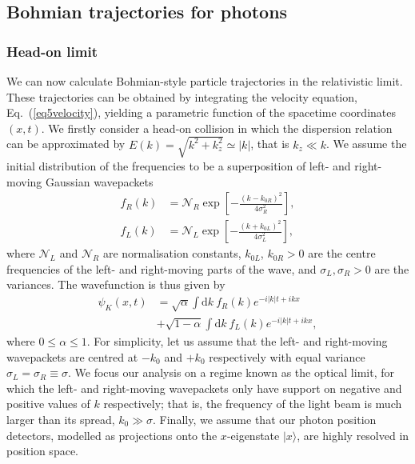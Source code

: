 \documentclass[
prx
,twocolumn
,nofootinbib
,floatfix
,superscriptaddress
]{revtex4-2}
\newcommand{\non}{\nonumber}
\newcommand{\D}{\mathrm{d}}
\begin{document}
\subsection{Bohmian trajectories for photons}\label{sec:trajectories}
\subsubsection{Head-on limit}
We can now calculate Bohmian-style particle trajectories in the relativistic limit. These trajectories can be obtained by integrating the velocity equation, Eq.\ (\ref{eq5velocity}), yielding a parametric function of the spacetime coordinates $(x,t)$. We firstly consider a head-on collision in which the dispersion relation can be approximated by $E(k) = \sqrt{k^2 + k_z^2} \simeq |k|$, that is $k_z \ll k$. We assume the initial distribution of the frequencies to be a superposition of left- and right-moving Gaussian wavepackets 
\begin{align}
    f_R(k) &= \mathcal{N}_R \exp \left[ - \frac{(k-k_{0R})^2}{4\sigma_R^2} \right], \label{f_right} \\
    f_L(k) &= \mathcal{N}_L \exp \left[ - \frac{(k + k_{0L})^2}{4\sigma_L^2} \right], \label{f_left}
\end{align}
where $\mathcal{N}_L$ and $\mathcal{N}_R$ are normalisation constants, $k_{0L}$, $k_{0R}>0$ are the centre frequencies of the left- and right-moving parts of the wave, and $\sigma_L,\sigma_R>0$ are the variances. The wavefunction is thus given by 
\begin{align}\label{11wavefunction}
    \psi_K(x,t) &= \sqrt{\alpha} \int\D k \: f_R(k) e^{-i|k|t + i k x} \non \\
    & + \sqrt{1 - \alpha} \int\D k \:f_L(k) e^{-i|k|t + i k x}, 
\end{align}
where $0\leq \alpha\leq 1$. For simplicity, let us assume that the left- and right-moving wavepackets are centred at $-k_0$ and $+k_0$ respectively with equal variance $\sigma_L = \sigma_R \equiv \sigma$. We focus our analysis on a regime known as the optical limit, for which the left- and right-moving wavepackets only have support on negative and positive values of $k$ respectively; that is, the frequency of the light beam is much larger than its spread, $k_0 \gg \sigma$. Finally, we assume that our photon position detectors, modelled as projections onto the $x$-eigenstate $|x \rangle$, are highly resolved in position space. 
\end{document}
